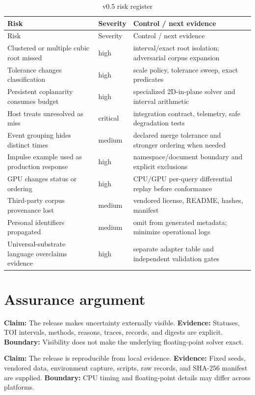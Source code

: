 \documentclass[11pt,a4paper,oneside]{book}
\newcommand{\claim}[1]{\textbf{Claim:} #1}
\newcommand{\evidence}[1]{\textbf{Evidence:} #1}
\newcommand{\boundary}[1]{\textbf{Boundary:} #1}
\begin{document}
\begin{longtable}{p{}p{}p{}}
\caption{v0.5 risk register}\\
\toprule
Risk & Severity & Control / next evidence\\
\midrule
\endfirsthead
\toprule
Risk & Severity & Control / next evidence\\
\midrule
\endhead
Clustered or multiple cubic root missed & high & interval/exact root isolation; adversarial corpus expansion\\
Tolerance changes classification & high & scale policy, tolerance sweep, exact predicates\\
Persistent coplanarity consumes budget & high & specialized 2D-in-plane solver and interval arithmetic\\
Host treats unresolved as miss & critical & integration contract, telemetry, safe degradation tests\\
Event grouping hides distinct times & medium & declared merge tolerance and stronger ordering when needed\\
Impulse example used as production response & high & namespace/document boundary and explicit exclusions\\
GPU changes status or ordering & high & CPU/GPU per-query differential replay before conformance\\
Third-party corpus provenance lost & medium & vendored license, README, hashes, manifest\\
Personal identifiers propagated & medium & omit from generated metadata; minimize operational logs\\
Universal-substrate language overclaims evidence & high & separate adapter table and independent validation gates\\
\bottomrule
\end{longtable}

\section{Assurance argument}

\claim{The release makes uncertainty externally visible.} \evidence{Statuses, TOI intervals, methods, reasons, traces, records, and digests are explicit.} \boundary{Visibility does not make the underlying floating-point solver exact.}

\claim{The release is reproducible from local evidence.} \evidence{Fixed seeds, vendored data, environment capture, scripts, raw records, and SHA-256 manifest are supplied.} \boundary{CPU timing and floating-point details may differ across platforms.}
\end{document}
